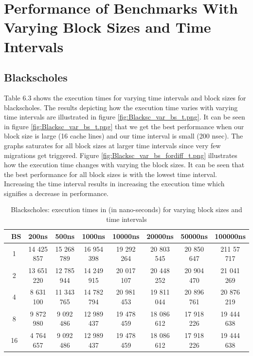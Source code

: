 \documentclass{listhesis}
\begin{document}
\section{Performance of Benchmarks With Varying Block Sizes and Time Intervals}
\subsection{Blackscholes}
Table 6.3 shows the execution times for varying time intervals and block sizes for blackscholes. The results depicting how the execution time varies with varying time intervals are illustrated in figure \ref{fig:Blacksc_var_bs_t.png}. It can be seen in figure \ref{fig:Blacksc_var_bs_t.png} that we get the best performance when our block size is large (16 cache lines) and our time interval is small (200 nsec). The graphs saturates for all block sizes at larger time intervals since very few migrations get triggered.
Figure \ref{fig:Blacksc_var_bs_fordiff_t.png} illustrates how the execution time changes with varying the block sizes. It can be seen that the best performance for all block sizes is with the lowest time interval. Increasing the time interval results in increasing the execution time which signifies a decrease in performance. 

\begin{table}[h!]
\begin{center}
 \begin{tabular}{|| c | c | c | c| c | c | c | c||} 
 \hline
 \ \textbf{BS} & \textbf{200ns}  & \textbf{500ns}  & \textbf{1000ns} & \textbf{10000ns} & \textbf{20000ns} & \textbf{50000ns} & \textbf{100000ns}\\ [0.5 ex] 
 \hline\hline
   1 & 14 425 857  & 15 268 789 &  16 954 398 & 19 292 264 & 20 803 545 & 20 850 647 &  211 57 717\\ 
 \hline
   2 & 13 651 220 & 12 785 944 & 14 249 915 & 20 017 107 & 20 448 252 & 20 904 470 & 21 041 269\\
 \hline
   4 & 8 631 100 & 11 343 765 & 14 782 794 & 20 981 453 & 19 811 044 & 20 896 761 & 20 876 219\\
 \hline
   8 & 9 872 980 & 9 092 486 & 12 989 437 & 19 478 459 & 18 086 612 & 17 918 226 & 19 444 638\\
  \hline
   16 & 4 764 657 & 9 092 486 & 12 989 437 & 19 478 459 & 18 086 612 & 17 918 226 & 19 444 638\\
    \hline
\end{tabular}
 \caption{Blackscholes: execution times in (in nano-seconds) for varying block sizes and time intervals}
 \label{table:ExecTimes2}
\end{center}
\end{table}
\end{document}
